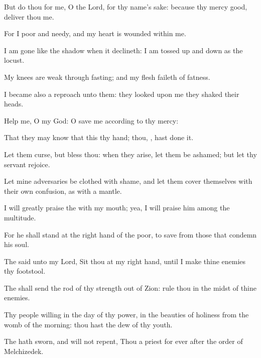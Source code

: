 {\Q {}But
do thou for me, O
{} the
Lord, for thy
name’s sake: because thy
mercy
{}
good,
deliver thou me.


\par }{\Q {}For I
{}
poor and
needy, and my
heart is
wounded
within me.


\par }{\Q {}I am
gone like the
shadow when it
declineth: I am tossed up and
down as the
locust.


\par }{\Q {}My
knees are
weak through
fasting; and my
flesh
faileth of
fatness.


\par }{\Q {}I became also a
reproach unto them:
{} they
looked upon me they
shaked their
heads.


\par }{\Q {}Help me, O
{} my
God: O
save me according to thy
mercy:


\par }{\Q {}That they may
know that this
{} thy
hand;
{} thou,
{}, hast
done it.


\par }{\Q {}Let them
curse, but
bless thou: when they
arise, let them be
ashamed; but let thy
servant
rejoice.


\par }{\Q {}Let mine
adversaries be
clothed with
shame, and let them
cover themselves with their own
confusion, as with a
mantle.


\par }{\Q {}I will
greatly
praise the
{} with my
mouth; yea, I will
praise him
among the
multitude.


\par }{\Q {}For he shall
stand at the right
hand of the
poor, to
save
{} from those that
condemn his
soul.




\par }
{\Q {}The
{}
said unto my
Lord,
Sit thou at my right
hand, until I
make thine
enemies thy
footstool.


\par }{\Q {}The
{} shall
send the
rod of thy
strength out of
Zion:
rule thou in the
midst of thine
enemies.


\par }{\Q {}Thy
people
{}
willing in the
day of thy
power, in the
beauties of
holiness from the
womb of the
morning: thou hast the
dew of thy
youth.


\par }{\Q {}The
{} hath
sworn, and will not
repent, Thou
{} a
priest for
ever after the
order of
Melchizedek.


\par }{\BB \par }
